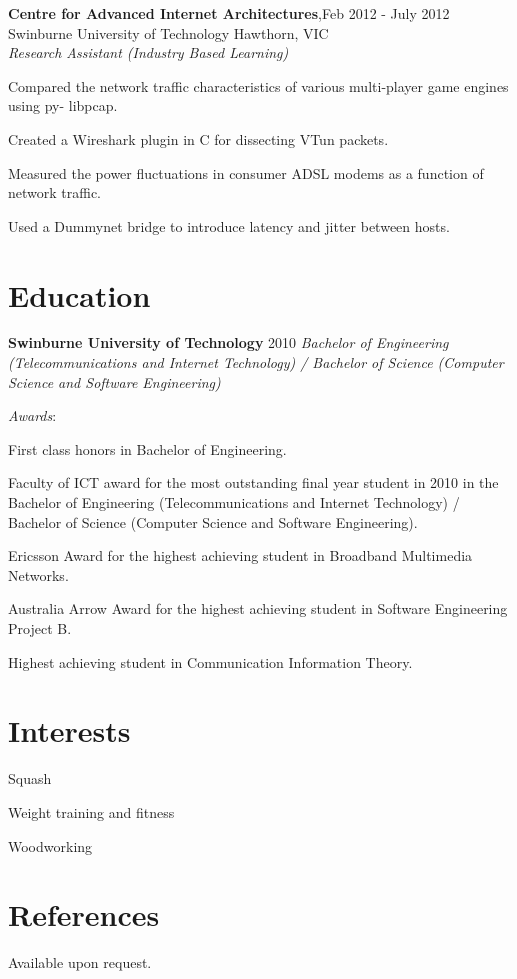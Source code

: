 \documentclass[line,margin]{res}
\begin{document}
\begin{resume}
        \textbf{Centre for Advanced Internet Architectures},\hfill Feb 2012 - July 2012 \\
        Swinburne University of Technology Hawthorn, VIC \\
        \textit{Research Assistant (Industry Based Learning)}
        \begin{list}{}{\leftmargin=1em \itemsep=-2pt}
            \item{Compared the network traffic characteristics of various multi-player game engines using py-
                libpcap.}
            \item{Created a Wireshark plugin in C for dissecting VTun packets.}
            \item{Measured the power fluctuations in consumer ADSL modems as a function of network traffic.}
            \item{Used a Dummynet bridge to introduce latency and jitter between hosts.}
        \end{list}

        \section{Education} \textbf{Swinburne University of Technology} \hfill 2010
        \textit{Bachelor of Engineering (Telecommunications and Internet Technology) / Bachelor of Science (Computer Science and Software Engineering)}

        \textit{Awards}:
        \begin{list}{}{\leftmargin=1em \itemsep=-2pt}
            \item{First class honors in Bachelor of Engineering.}
            \item{Faculty of ICT award for the most outstanding final year student in 2010 in the Bachelor of Engineering (Telecommunications and Internet Technology) / Bachelor of Science (Computer Science and Software Engineering).}
            \item{Ericsson Award for the highest achieving student in Broadband Multimedia Networks.}
            \item{Australia Arrow Award for the highest achieving student in Software Engineering Project B.}
            \item{Highest achieving student in Communication Information Theory.}
        \end{list}

        \section{Interests}
        \begin{list}{}{\leftmargin=1em \itemsep=-2pt}
            \item{Squash}
            \item{Weight training and fitness}
            \item{Woodworking}
        \end{list}

        \section{References}
        Available upon request.
    \end{resume}
\end{document}
